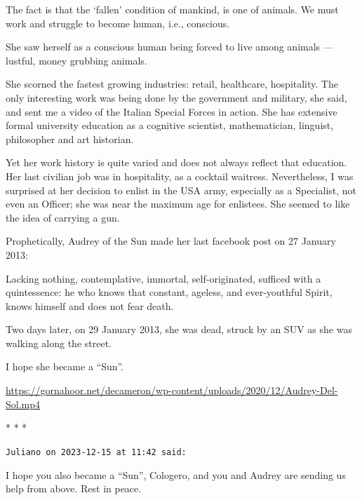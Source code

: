 \begin{quotex}
The fact is that the `fallen' condition of mankind, is one of animals. We must work and struggle to become human, i.e., conscious.
\end{quotex}


She saw herself as a conscious human being forced to live among animals --- lustful, money grubbing animals.

She scorned the fastest growing industries: retail, healthcare, hospitality. The only interesting work was being done by the government and military, she said, and sent me a video of the Italian Special Forces in action. She has extensive formal university education as a cognitive scientist, mathematician, linguist, philosopher and art historian.

Yet her work history is quite varied and does not always reflect that education. Her last civilian job was in hospitality, as a cocktail waitress. Nevertheless, I was surprised at her decision to enlist in the USA army, especially as a Specialist, not even an Officer; she was near the maximum age for enlistees. She seemed to like the idea of carrying a gun.

Prophetically, Audrey of the Sun made her last facebook post on 27 January 2013:

\begin{quotex}
Lacking nothing, contemplative, immortal, self-originated, sufficed with a quintessence: he who knows that constant, ageless, and ever-youthful Spirit, knows himself and does not fear death.
\end{quotex}


Two days later, on 29 January 2013, she was dead, struck by an SUV as she was walking along the street.

I hope she became a ``Sun''.

\url{https://gornahoor.net/decameron/wp-content/uploads/2020/12/Audrey-Del-Sol.mp4}




\begin{center}* * *\end{center}

\begin{footnotesize}
\begin{sffamily}
\texttt{Juliano on 2023-12-15 at 11:42 said:}

I hope you also became a ``Sun'', Cologero, and you and Audrey are sending us help from above. Rest in peace.


\hfill

\end{sffamily}
\end{footnotesize}


